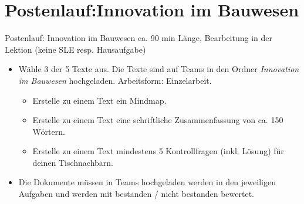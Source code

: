 \section{Postenlauf:Innovation im Bauwesen}
\begin{frame}{Postenlauf: Innovation im Bauwesen}
    ca. 90 min Länge, Bearbeitung in der Lektion (keine SLE resp. Hausaufgabe)
    \begin{itemize}
        \item [\textbullet] Wähle 3 der 5 Texte aus. Die Texte sind auf Teams in den Ordner \textit{Innovation im Bauwesen} hochgeladen. Arbeitsform: Einzelarbeit.
        \begin{itemize}
            \item [\textbullet] Erstelle zu einem Text ein Mindmap. 
            \item [\textbullet] Erstelle zu einem Text eine schriftliche Zusammenfassung von ca. 150 Wörtern.
            \item [\textbullet] Erstelle zu einem Text mindestens 5 Kontrollfragen (inkl. Lösung) für deinen Tischnachbarn.
        \end{itemize}
        \item [\textbullet] Die Dokumente müssen in Teams hochgeladen  werden in den jeweiligen Aufgaben und werden mit bestanden / nicht bestanden bewertet.
    \end{itemize}
    \end{frame}

